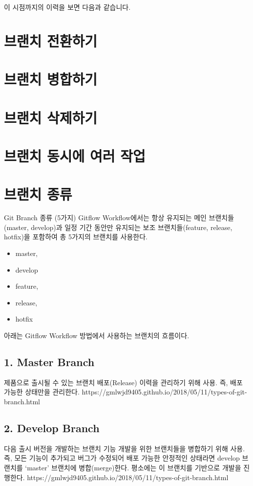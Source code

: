 \documentclass[12pt, a4paper, oneside]{book}
\let\stdsection\section
\renewcommand\section{\newpage\stdsection}
\begin{document}
이 시점까지의 이력을 보면 다음과 같습니다.






	\section{브랜치 전환하기 }
	\section{브랜치 병합하기 }
	\section{브랜치 삭제하기 }
	\section{브랜치 동시에 여러 작업 }
	\section{브랜치 종류 }


Git Branch 종류 (5가지)
Gitflow Workflow에서는 항상 유지되는 메인 브랜치들(master, develop)과 
일정 기간 동안만 유지되는 보조 브랜치들(feature, release, hotfix)을 포함하여 총 5가지의 브랜치를 사용한다.

			\begin{itemize}	[	
							topsep=0.0em,
							itemsep=0.0em,
							leftmargin=6em, 
							labelsep=3em 
							]
				\item	master,
				\item	develop
				\item	feature, 
				\item	release, 
				\item	hotfix
			\end{itemize}
아래는 Gitflow Workflow 방법에서 사용하는 브랜치의 흐름이다.


	\subsection{1. Master Branch}
		제품으로 출시될 수 있는 브랜치
		배포(Release) 이력을 관리하기 위해 사용. 즉, 배포 가능한 상태만을 관리한다.
		https://gmlwjd9405.github.io/2018/05/11/types-of-git-branch.html

	\subsection{2. Develop Branch}
다음 출시 버전을 개발하는 브랜치
기능 개발을 위한 브랜치들을 병합하기 위해 사용. 즉, 모든 기능이 추가되고 버그가 수정되어 배포 가능한 안정적인 상태라면 develop 브랜치를 ‘master’ 브랜치에 병합(merge)한다.
평소에는 이 브랜치를 기반으로 개발을 진행한다.
https://gmlwjd9405.github.io/2018/05/11/types-of-git-branch.html
\end{document}
